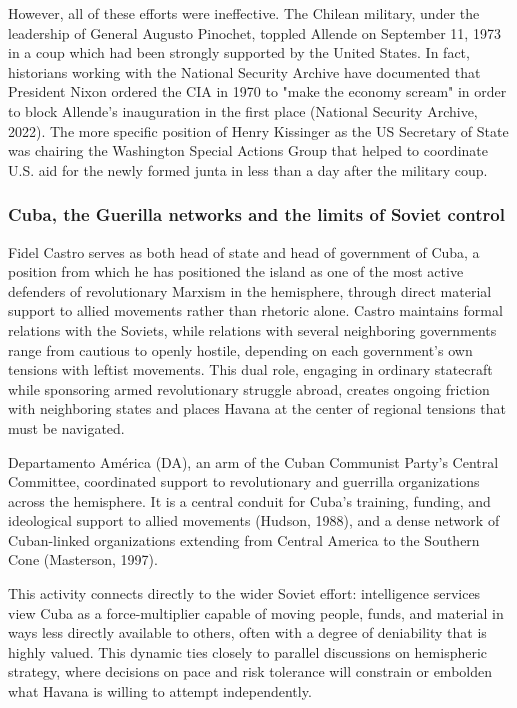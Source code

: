 However, all of these efforts were ineffective. The Chilean military, under the leadership of General Augusto Pinochet, toppled Allende on September 11, 1973 in a coup which had been strongly supported by the United States. In fact, historians working with the National Security Archive have documented that President Nixon ordered the CIA in 1970 to "make the economy scream" in order to block Allende's inauguration in the first place (National Security Archive, 2022). The more specific position of Henry Kissinger as the US Secretary of State was chairing the Washington Special Actions Group that helped to coordinate U.S. aid for the newly formed junta in less than a day after the military coup.

\subsubsection{Cuba, the Guerilla networks and the limits of Soviet control}

Fidel Castro serves as both head of state and head of government of Cuba, a position from which he has positioned the island as one of the most active defenders of revolutionary Marxism in the hemisphere, through direct material support to allied movements rather than rhetoric alone. Castro maintains formal relations with the Soviets, while relations with several neighboring governments range from cautious to openly hostile, depending on each government's own tensions with leftist movements. This dual role, engaging in ordinary statecraft while sponsoring armed revolutionary struggle abroad, creates ongoing friction with neighboring states and places Havana at the center of regional tensions that must be navigated.

Departamento América (DA), an arm of the Cuban Communist Party's Central Committee, coordinated support to revolutionary and guerrilla organizations across the hemisphere. It is a central conduit for Cuba's training, funding, and ideological support to allied movements (Hudson, 1988), and a dense network of Cuban-linked organizations extending from Central America to the Southern Cone (Masterson, 1997).

This activity connects directly to the wider Soviet effort: intelligence services view Cuba as a force-multiplier capable of moving people, funds, and material in ways less directly available to others, often with a degree of deniability that is highly valued. This dynamic ties closely to parallel discussions on hemispheric strategy, where decisions on pace and risk tolerance will constrain or embolden what Havana is willing to attempt independently.

